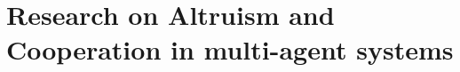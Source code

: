 \documentclass[a4paper]{book}
\begin{document}



\section{Research on Altruism and Cooperation in multi-agent systems}
\label{sec:cs}
\end{document}
